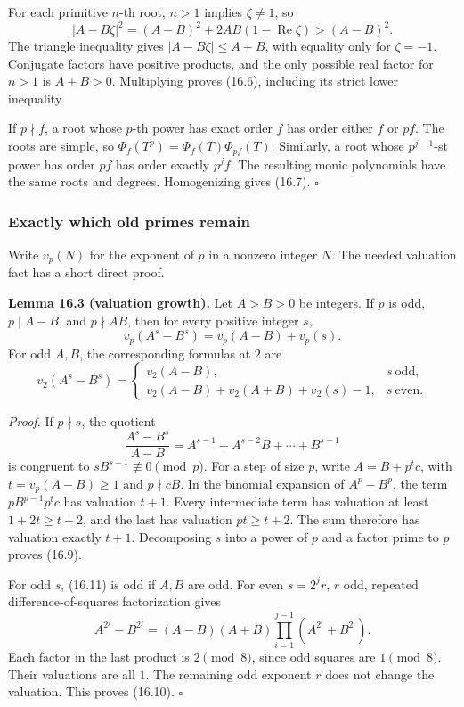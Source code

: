 \documentclass[
  11pt,
  a4paper,
]{article}
\begin{document}
For each primitive \(n\)-th root, \(n>1\) implies \(\zeta\ne1\), so \[
 |A-B\zeta|^2=(A-B)^2+2AB(1-\operatorname{Re}\zeta)>(A-B)^2.
 \tag{16.8}
\] The triangle inequality gives \(|A-B\zeta|\leq A+B\), with equality
only for \(\zeta=-1\). Conjugate factors have positive products, and the
only possible real factor for \(n>1\) is \(A+B>0\). Multiplying proves
(16.6), including its strict lower inequality.

If \(p\nmid f\), a root whose \(p\)-th power has exact order \(f\) has
order either \(f\) or \(pf\). The roots are simple, so
\(\Phi_f(T^p)=\Phi_f(T)\Phi_{pf}(T)\). Similarly, a root whose
\(p^{j-1}\)-st power has order \(pf\) has order exactly \(p^jf\). The
resulting monic polynomials have the same roots and degrees.
Homogenizing gives (16.7). \(\square\)

\subsubsection{Exactly which old primes
remain}\label{exactly-which-old-primes-remain}

Write \(v_p(N)\) for the exponent of \(p\) in a nonzero integer \(N\).
The needed valuation fact has a short direct proof.

\textbf{Lemma 16.3 (valuation growth).} Let \(A>B>0\) be integers. If
\(p\) is odd, \(p\mid A-B\), and \(p\nmid AB\), then for every positive
integer \(s\), \[
 v_p(A^s-B^s)=v_p(A-B)+v_p(s).
 \tag{16.9}
\] For odd \(A,B\), the corresponding formulas at \(2\) are \[
 v_2(A^s-B^s)=
 \begin{cases}
 v_2(A-B),&s\ \text{odd},\\
 v_2(A-B)+v_2(A+B)+v_2(s)-1,&s\ \text{even}.
 \end{cases}
 \tag{16.10}
\]

\emph{Proof.} If \(p\nmid s\), the quotient \[
 \frac{A^s-B^s}{A-B}
   =A^{s-1}+A^{s-2}B+\cdots+B^{s-1}
 \tag{16.11}
\] is congruent to \(sB^{s-1}\not\equiv0\pmod p\). For a step of size
\(p\), write \(A=B+p^t c\), with \(t=v_p(A-B)\geq1\) and \(p\nmid cB\).
In the binomial expansion of \(A^p-B^p\), the term \(pB^{p-1}p^tc\) has
valuation \(t+1\). Every intermediate term has valuation at least
\(1+2t\geq t+2\), and the last has valuation \(pt\geq t+2\). The sum
therefore has valuation exactly \(t+1\). Decomposing \(s\) into a power
of \(p\) and a factor prime to \(p\) proves (16.9).

For odd \(s\), (16.11) is odd if \(A,B\) are odd. For even \(s=2^j r\),
\(r\) odd, repeated difference-of-squares factorization gives \[
 A^{2^j}-B^{2^j}
  =(A-B)(A+B)\prod_{i=1}^{j-1}(A^{2^i}+B^{2^i}).
 \tag{16.12}
\] Each factor in the last product is \(2\pmod8\), since odd squares are
\(1\pmod8\). Their valuations are all \(1\). The remaining odd exponent
\(r\) does not change the valuation. This proves (16.10). \(\square\)
\end{document}
